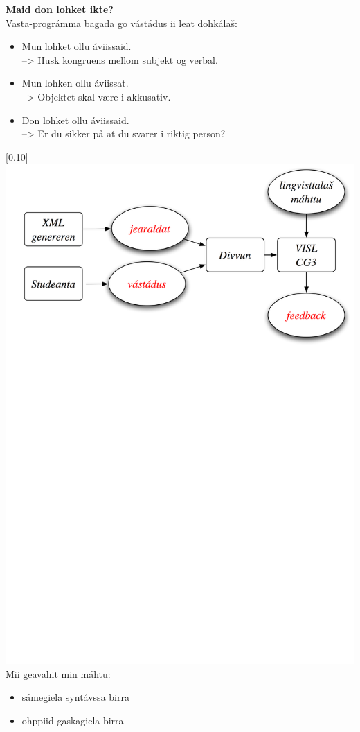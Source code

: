 \documentclass[landscape,norsk,11pt]{seminar}
\begin{document}
\begin{slide}
\newslide
\textbf{Maid don lohket ikte?}\\
Vasta-prográmma bagada go vástádus ii leat dohkálaš:
\begin{itemize}
\item Mun lohket ollu \'aviissaid. \\ --> Husk kongruens mellom subjekt og verbal.
\item Mun lohken ollu \'aviissat. \\ --> Objektet skal være i akkusativ.
\item Don lohket ollu \'aviissaid. \\ --> Er du sikker på at du svarer i riktig person?
\end{itemize}

\newslide
\scalebox{0.10}[0.10]{\includegraphics{img/skovi.png}} 
\newslide
Mii geavahit min máhtu:
\begin{itemize}
\item sámegiela syntávssa birra		
\item ohppiid gaskagiela birra
\end{itemize}


\end{slide}
\end{document}
